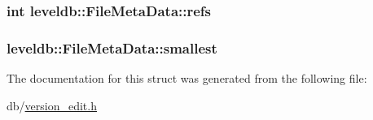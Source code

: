 \hypertarget{structleveldb_1_1_file_meta_data_a199e4ba2167c8facad8bd41269982935}{
\subsubsection[{refs}]{\setlength{\rightskip}{0pt plus 5cm}int leveldb\-::\-File\-Meta\-Data\-::refs}}\label{structleveldb_1_1_file_meta_data_a199e4ba2167c8facad8bd41269982935}
\hypertarget{structleveldb_1_1_file_meta_data_a9e5e5c149495aede836ac637cd89269f}{
\subsubsection[{smallest}]{ leveldb\-::\-File\-Meta\-Data\-::smallest}}\label{structleveldb_1_1_file_meta_data_a9e5e5c149495aede836ac637cd89269f}


The documentation for this struct was generated from the following file\-:\begin{DoxyCompactItemize}
\item 
db/\hyperlink{version__edit_8h}{version\-\_\-edit.\-h}\end{DoxyCompactItemize}
